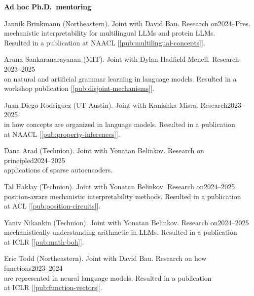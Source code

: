\documentclass[10pt]{article}
\renewcommand{\subsection}[1]{\textcolor{black}{#1}}
\newcommand{\halfblankline}{\quad\vspace{-0.5\baselineskip}\pagebreak[3]}
\begin{document}
	\halfblankline

	\subsection{\textbf{Ad hoc Ph.D.\ mentoring}}
	\begin{innerlist}
	\item Jannik Brinkmann (Northeastern). Joint with David Bau. Research on\hfill 2024--Pres.\\
	      mechanistic interpretability for multilingual LLMs and protein LLMs.\\Resulted
		  in a publication at NAACL [\ref{pub:multilingual-concepts}].
	\item Aruna Sankaranarayanan (MIT). Joint with Dylan Hadfield-Menell. Research \hfill 2023--2025\\
	on natural and artificial grammar learning in language models. Resulted in a\\workshop publication [\ref{pub:disjoint-mechanisms}].
	\item Juan Diego Rodriguez (UT Austin). Joint with Kanishka Misra. Research\hfill 2023--2025\\
	in how concepts are organized in language models. Resulted in a publication\\at NAACL [\ref{pub:property-inferences}].
	\item Dana Arad (Technion). Joint with Yonatan Belinkov. Research on principled\hfill 2024--2025\\applications of sparse autoencoders.
	\item Tal Haklay (Technion). Joint with Yonatan Belinkov. Research on\hfill 2024--2025\\position-aware mechanistic interpretability methods.
	      Resulted in a publication\\at ACL [\ref{pub:position-circuits}].
	\item Yaniv Nikankin (Technion). Joint with Yonatan Belinkov. Research on\hfill 2024--2025\\mechanistically understanding arithmetic in LLMs.
	      Resulted in a publication\\at ICLR [\ref{pub:math-boh}].
	\item Eric Todd (Northeastern). Joint with David Bau. Research on how functions\hfill 2023--2024\\are
		  represented in neural language models. Resulted in a publication\\at ICLR [\ref{pub:function-vectors}].
	\end{innerlist}
\end{document}
